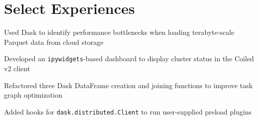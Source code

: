%
%

%
%

%
%


\section{Select Experiences}

\begin{tightemize}
\item Used Dask to identify performance bottlenecks when loading terabyte-scale Parquet data from cloud storage
\item Developed an \verb|ipywidgets|-based dashboard to display cluster status in the Coiled v2 client
\item Refactored three Dask DataFrame creation and joining functions to improve task graph optimization
\item Added hooks for \verb|dask.distributed.Client| to run user-supplied preload plugins
\end{tightemize}

\sectionsep

\\
\\

